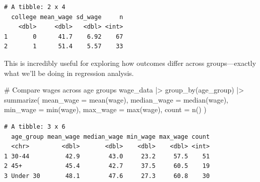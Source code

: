 \documentclass[
  letterpaper,
  DIV=11,
  numbers=noendperiod]{scrreprt}
\newenvironment{Shaded}{\begin{snugshade}}{\end{snugshade}}
\newcommand{\AttributeTok}[1]{\textcolor[rgb]{0.40,0.45,0.13}{#1}}
\newcommand{\CommentTok}[1]{\textcolor[rgb]{0.37,0.37,0.37}{#1}}
\newcommand{\FunctionTok}[1]{\textcolor[rgb]{0.28,0.35,0.67}{#1}}
\newcommand{\NormalTok}[1]{\textcolor[rgb]{0.00,0.23,0.31}{#1}}
\newcommand{\SpecialCharTok}[1]{\textcolor[rgb]{0.37,0.37,0.37}{#1}}
\begin{document}
\begin{verbatim}
# A tibble: 2 x 4
  college mean_wage sd_wage     n
    <dbl>     <dbl>   <dbl> <int>
1       0      41.7    6.92    67
2       1      51.4    5.57    33
\end{verbatim}

This is incredibly useful for exploring how outcomes differ across
groups---exactly what we'll be doing in regression analysis.

\begin{Shaded}
\begin{Highlighting}[]
\CommentTok{\# Compare wages across age groups}
\NormalTok{wage\_data }\SpecialCharTok{|\textgreater{}}
  \FunctionTok{group\_by}\NormalTok{(age\_group) }\SpecialCharTok{|\textgreater{}}
  \FunctionTok{summarize}\NormalTok{(}
    \AttributeTok{mean\_wage =} \FunctionTok{mean}\NormalTok{(wage),}
    \AttributeTok{median\_wage =} \FunctionTok{median}\NormalTok{(wage),}
    \AttributeTok{min\_wage =} \FunctionTok{min}\NormalTok{(wage),}
    \AttributeTok{max\_wage =} \FunctionTok{max}\NormalTok{(wage),}
    \AttributeTok{count =} \FunctionTok{n}\NormalTok{()}
\NormalTok{  )}
\end{Highlighting}
\end{Shaded}

\begin{verbatim}
# A tibble: 3 x 6
  age_group mean_wage median_wage min_wage max_wage count
  <chr>         <dbl>       <dbl>    <dbl>    <dbl> <int>
1 30-44          42.9        43.0     23.2     57.5    51
2 45+            45.4        42.7     37.5     60.5    19
3 Under 30       48.1        47.6     27.3     60.8    30
\end{verbatim}
\end{document}
